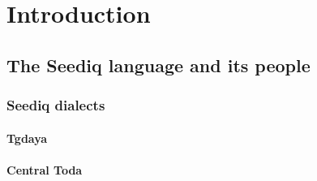\documentclass[master]{NTHUthesis}
\begin{document}
\makecover


\begin{abstractEN}
\lipsum[1-2]
\end{abstractEN}

\begin{abstractSED}
\lipsum[1-2]
\end{abstractSED}

\begin{abstractZH}
\zhlipsum[1][name=trad]
\end{abstractZH}

\begin{acknowledgementsEN}
\lipsum[1-2]
\end{acknowledgementsEN}

\maketoc

\listofalgorithms
{}
\clearpage



\chapter{Introduction}
\lipsum[1-2] \textcite{blust1999subgrouping} \pan

\section{The Seediq language and its people}
\lipsum[1-3]

\subsection{Seediq dialects}
\lipsum[1]

\subsubsection{Tgdaya}
\lipsum[1-2]

\subsubsection{Central Toda}
\lipsum[1]
\end{document}
